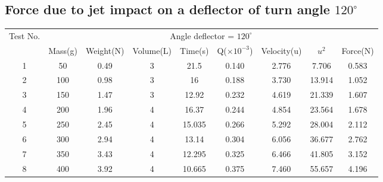 \documentclass[12pt,a4paper]{article}
\begin{document}
\subsection{Force due to jet impact on a deflector of turn angle $120^{\circ}$}
\begin{table}[ht]


\begin{flushleft}
\begin{tabular}{ |c|c|c|c|c|c|c|c|c| } 
\hline

 \multirow{2}{*}{Test No.} & \multicolumn{8}{c|}{Angle deflector = $120^{\circ}$ } \\ \cline{2-9}
                           & Mass(g)& Weight(N) & Volume(L) & Time(s) & Q($\times10 ^{-3}$) & Velocity(u) & $u^2$ & Force(N)\\ \hline
 1                         & 50 & 0.49 & 3 & 21.5 & 0.140 & 2.776 & 7.706 & 0.583  \\ \hline
 2                         & 100 & 0.98 & 3 & 16 & 0.188 & 3.730 & 13.914 & 1.052 \\ \hline
 3                         & 150 & 1.47 & 3 & 12.92 & 0.232 & 4.619 & 21.339 & 1.607\\ \hline
 4                         & 200 & 1.96 & 4 & 16.37 & 0.244 & 4.854 & 23.564 & 1.678\\ \hline
 5                         & 250 & 2.45 & 4 & 15.035 & 0.266 & 5.292 & 28.004 & 2.112 \\ \hline
 6                         & 300 & 2.94 & 4 & 13.14 & 0.304 & 6.056 & 36.677 & 2.762 \\ \hline
 7                         & 350 & 3.43 & 4 & 12.295 & 0.325 & 6.466 & 41.805 & 3.152 \\ \hline
 8                         & 400 & 3.92 & 4 & 10.665 & 0.375 & 7.460 & 55.657 & 4.196 \\ \hline
\end{tabular}
\end{flushleft}
\end{table}
\end{document}
